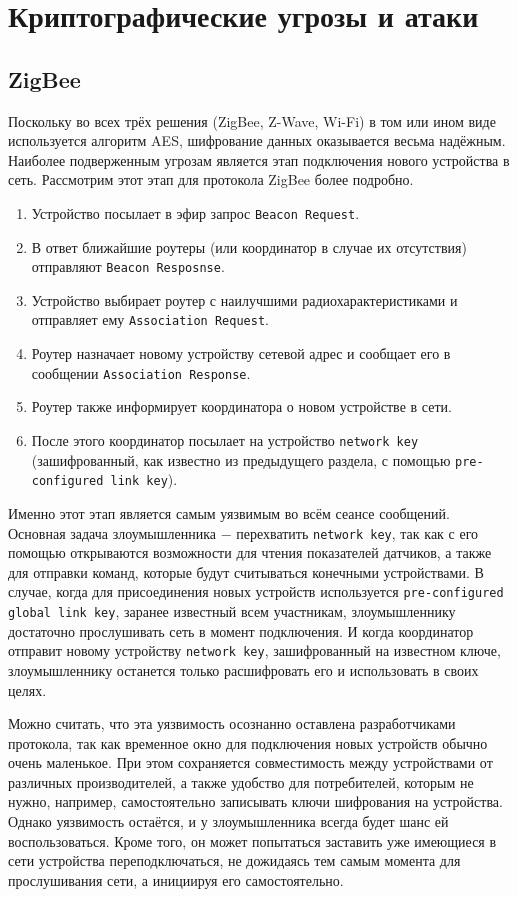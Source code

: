\chapter{Криптографические угрозы и атаки}

	\section{ZigBee}
	Поскольку во всех трёх решения (ZigBee, Z-Wave, Wi-Fi) в том или ином виде используется алгоритм 
	AES, шифрование данных оказывается весьма надёжным. Наиболее подверженным угрозам является
	этап подключения нового устройства в сеть. Рассмотрим этот этап для протокола ZigBee более подробно.
	
	\begin{enumerate}
		\item Устройство посылает в эфир запрос \texttt{Beacon Request}.
		\item В ответ ближайшие роутеры (или координатор в случае их отсутствия) отправляют \texttt{Beacon Resposnse}.
		\item Устройство выбирает роутер с наилучшими радиохарактеристиками и отправляет ему \texttt{Association 
		Request}.
		\item Роутер назначает новому устройству сетевой адрес и сообщает его в сообщении \texttt{Association 
		Response}.
		\item Роутер также информирует координатора о новом устройстве в сети.
		\item После этого координатор посылает на устройство \texttt{network key} (зашифрованный, как известно
		из предыдущего раздела, с помощью \texttt{pre-configured link key}).
	\end{enumerate}

	Именно этот этап является самым уязвимым во всём сеансе сообщений. Основная задача злоумышленника
	$-$ перехватить \texttt{network key}, так как с его помощью открываются возможности для чтения показателей 
	датчиков, а также для отправки команд, которые будут считываться конечными устройствами. В случае,
	когда для присоединения новых устройств используется \texttt{pre-configured global link key}, заранее известный
	всем участникам, злоумышленнику достаточно прослушивать сеть в момент подключения. И когда
	координатор отправит новому устройству \texttt{network key}, зашифрованный на известном ключе, злоумышленнику
	останется только расшифровать его и использовать в своих целях.
	
	Можно считать, что эта уязвимость осознанно оставлена разработчиками протокола, так как временное 
	окно для подключения новых устройств обычно очень маленькое. При этом сохраняется совместимость
	между устройствами от различных производителей, а также удобство для потребителей, которым не
	нужно, например, самостоятельно записывать ключи шифрования на устройства. Однако уязвимость 
	остаётся, и у злоумышленника всегда будет шанс ей воспользоваться. Кроме того, он может попытаться
	заставить уже имеющиеся в сети устройства переподключаться, не дожидаясь тем самым момента для
	прослушивания сети, а инициируя его самостоятельно.
	
